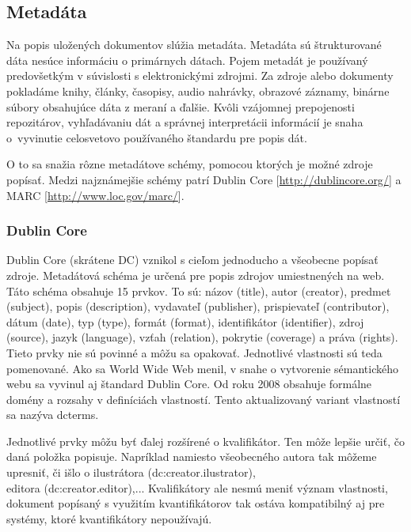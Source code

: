 \documentclass[thesis=M,slovak]{FITthesis}[2013/05/06]
\begin{document}

\subsection{Metadáta}
Na popis uložených dokumentov slúžia metadáta. Metadáta sú štrukturované dáta nesúce informáciu o primárnych dátach. Pojem metadát je používaný predovšetkým v súvislosti s elektronickými zdrojmi. \cite{iso8459-5} Za zdroje alebo dokumenty pokladáme knihy, články, časopisy, audio nahrávky, obrazové záznamy, binárne súbory obsahujúce dáta z meraní a ďalšie. Kvôli vzájomnej prepojenosti repozitárov, vyhľadávaniu dát a správnej interpretácii informácií je snaha o~vyvinutie celosvetovo používaného štandardu pre popis dát. 

O to sa snažia rôzne metadátove schémy, pomocou ktorých je možné zdroje popísať. Medzi najznámejšie schémy patrí Dublin Core [\url{http://dublincore.org/}] a MARC [\url{http://www.loc.gov/marc/}].

\subsubsection{Dublin Core}
Dublin Core (skrátene DC) vznikol s cieľom jednoducho a všeobecne popísať zdroje. Metadátová schéma je určená pre popis zdrojov umiestnených na web. Táto schéma obsahuje 15 prvkov. To sú: názov (title), autor (creator), predmet (subject), popis (description), vydavateľ (publisher), prispievateľ (contributor), dátum (date), typ (type), formát (format), identifikátor (identifier), zdroj (source), jazyk (language), vzťah (relation), pokrytie (coverage) a práva (rights). \cite[s.~37]{zhang2014creating} Tieto prvky nie sú povinné a môžu sa opakovať. Jednotlivé vlastnosti sú teda pomenované. Ako sa World Wide Web menil, v snahe o vytvorenie sémantického webu sa vyvinul aj štandard Dublin Core. Od roku 2008 obsahuje formálne domény a rozsahy v definíciách vlastností. Tento aktualizovaný variant vlastností sa nazýva dcterms. 

Jednotlivé prvky môžu byť ďalej rozšírené o kvalifikátor. Ten môže lepšie určiť, čo daná položka popisuje. Napríklad namiesto všeobecného autora tak môžeme upresniť, či išlo o ilustrátora (dc:creator.ilustrator), \\editora (dc:creator.editor),... Kvalifikátory ale nesmú meniť význam vlastnosti, dokument popísaný s využitím kvantifikátorov tak ostáva kompatibilný aj pre systémy, ktoré kvantifikátory nepoužívajú.\cite[s.~295]{witten2009build}
\end{document}
